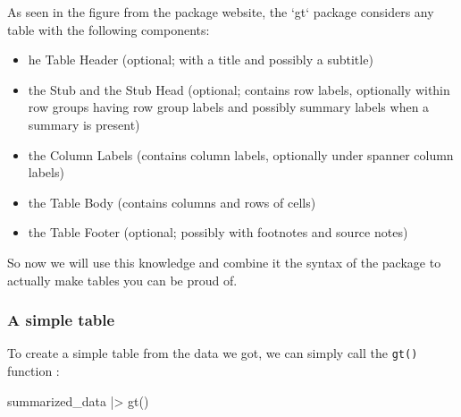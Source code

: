 \documentclass[
]{article}
\newenvironment{Shaded}{\begin{snugshade}}{\end{snugshade}}
\newcommand{\FunctionTok}[1]{\textcolor[rgb]{0.00,0.00,0.00}{#1}}
\newcommand{\NormalTok}[1]{#1}
\newcommand{\SpecialCharTok}[1]{\textcolor[rgb]{0.00,0.00,0.00}{#1}}
\begin{document}
As seen in the figure from the package website, the `gt` package
considers any table with the following components:

\begin{itemize}
\item
  he Table Header (optional; with a title and possibly a subtitle)
\item
  the Stub and the Stub Head (optional; contains row labels, optionally
  within row groups having row group labels and possibly summary labels
  when a summary is present)
\item
  the Column Labels (contains column labels, optionally under spanner
  column labels)
\item
  the Table Body (contains columns and rows of cells)
\item
  the Table Footer (optional; possibly with footnotes and source notes)
\end{itemize}

So now we will use this knowledge and combine it the syntax of the
package to actually make tables you can be proud of.

\hypertarget{a-simple-table}{%
\subsubsection{A simple table}\label{a-simple-table}}

To create a simple table from the data we got, we can simply call the
\texttt{gt()} function :

\begin{Shaded}
\begin{Highlighting}[]
\NormalTok{summarized\_data }\SpecialCharTok{|\textgreater{}} 
  \FunctionTok{gt}\NormalTok{()}
\end{Highlighting}
\end{Shaded}
\end{document}

